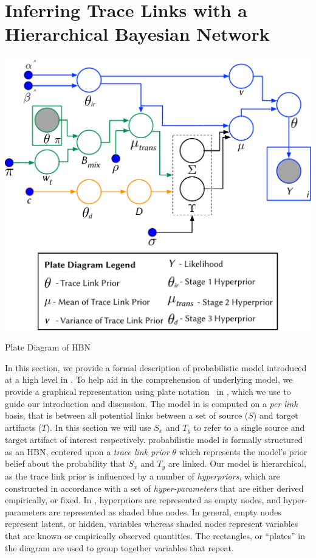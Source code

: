 \chapter{Inferring Trace Links with \hfill \break a Hierarchical Bayesian Network}
\label{ch:appI-approach}

\begin{marginfigure}%
\centering

\includegraphics[width=\columnwidth]{graphics/applicationsI-approach/fig1_Model-Plate-Diagram.pdf}

\caption{Plate Diagram of \Comets HBN}
\label{fig:model-approachI}
\end{marginfigure}

In this section, we provide a formal description of \Comets probabilistic model introduced at a high level in  . To help aid in the comprehension of \Comets underlying model, we provide a graphical representation using plate notation~\citep{Murphy:2012} in , which we use to guide our introduction and discussion. The model in  is computed on a \textit{per link} basis, that is between all potential links between a set of source ($S$) and target artifacts ($T$). In this section we will use $S_x$ and $T_y$ to refer to a single source and target artifact of interest respectively. \Comets probabilistic model is formally structured as an HBN, centered upon a \textit{trace link prior} $\theta$ which represents the model's prior belief about the probability that $S_x$ and $T_y$ are linked.  Our model is hierarchical, as the trace link prior is influenced by a number of \textit{hyperpriors}, which are constructed in accordance with a set of \textit{hyper-parameters} that are either derived empirically, or fixed. In , hyperpriors are represented as empty nodes, and hyper-parameters are represented as shaded blue nodes. In general, empty nodes represent latent, or hidden, variables whereas shaded nodes represent variables that are known or empirically observed quantities. The rectangles, or ``plates'' in the diagram are used to group together variables that repeat.

